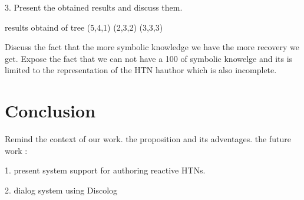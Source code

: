 \documentclass[conference]{IEEEtran}
\begin{document}
	
		3. Present the obtained results and discuss them. 
		
		results obtaind of tree (5,4,1) (2,3,2) (3,3,3) 
		
		
		Discuss the fact that the more symbolic knowledge we have the more recovery we get. 
		Expose the fact that we can not have a 100 of symbolic knowelge and its is limited to the representation of the HTN hauthor which is also incomplete.
		
	\section{Conclusion}
	Remind the context of our work. the proposition and its adventages. the future work : 
	
	1. present system support  for authoring reactive HTNs. 
	
	
	2. dialog system using Discolog
	
	
	
	
	
%	
%	
	
\end{document}
